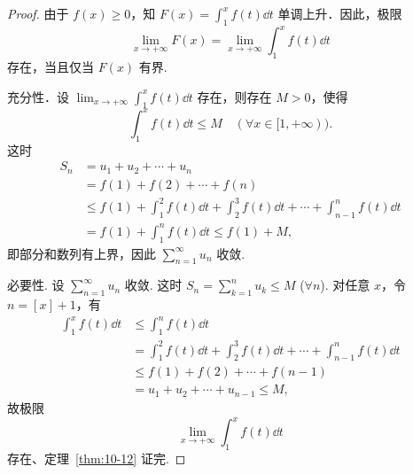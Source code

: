 \begin{proof}
由于 $f(x)\geqslant0$，知 $F(x)=\displaystyle\int_{1}^{x}f(t)\dd t$ 单调上升．因此，极限
\[
\lim_{x\to+\infty}F(x)=\lim_{x\to+\infty}\int_{1}^{x}f(t)\dd t
\]
存在，当且仅当 $F(x)$ 有界.

充分性．设 $\displaystyle\lim_{x\to+\infty}\int_{1}^{x}f(t)\dd t$ 存在，则存在 $M>0$，使得
\[
\int_{1}^{x}f(t)\dd t\leqslant M\quad(\forall x\in[1,+\infty)).
\]
这时
\[
\begin{aligned}
S_{n}&=u_{1}+u_{2}+\cdots+u_{n}\\
&=f(1)+f(2)+\cdots+f(n)\\
&\leqslant f(1)+\int_{1}^{2}f(t)\dd t+\int_{2}^{3}f(t)\dd t+\cdots+\int_{n-1}^{n}f(t)\dd t\\
&=f(1)+\int_{1}^{n}f(t)\dd t\leqslant f(1)+M,
\end{aligned}
\]
即部分和数列有上界，因此 $\sum_{n=1}^{\infty}u_{n}$ 收敛.

必要性. 设 $\sum_{n=1}^{\infty}u_{n}$ 收敛. 这时 $S_{n}=\sum_{k=1}^{n}u_{k}\leq M$ ($\forall n$). 对任意 $x$，令 $n=[x]+1$，有
\[
\begin{aligned}
\int_{1}^{x}f(t)\dd t&\leqslant\int_{1}^{n}f(t)\dd t\\
&=\int_{1}^{2}f(t)\dd t+\int_{2}^{3}f(t)\dd t+\cdots+\int_{n-1}^{n}f(t)\dd t\\
&\leqslant f(1)+f(2)+\cdots+f(n-1)\\
&=u_{1}+u_{2}+\cdots+u_{n-1}\leqslant M,
\end{aligned}
\]
故极限
\[
\lim_{x\to+\infty}\int_{1}^{x}f(t)\dd t
\]
存在、定理~\ref{thm:10-12} 证完.
\end{proof}

\begin{figure}[htbp]
\centering
{}
\caption{\relax}
\label{fig:10-1}
\end{figure}

